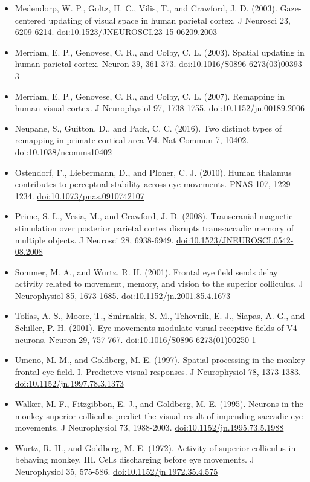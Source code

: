 \documentclass[11pt,a4paper]{article}
\begin{document}
\begin{itemize}[itemsep=2pt,topsep=2pt]
\item Medendorp, W. P., Goltz, H. C., Vilis, T., and Crawford, J. D. (2003). Gaze-centered updating of visual space in human parietal cortex. J Neurosci 23, 6209-6214. \href{https://doi.org/10.1523/JNEUROSCI.23-15-06209.2003}{doi:10.1523/JNEUROSCI.23-15-06209.2003}
\item Merriam, E. P., Genovese, C. R., and Colby, C. L. (2003). Spatial updating in human parietal cortex. Neuron 39, 361-373. \href{https://doi.org/10.1016/S0896-6273(03)00393-3}{doi:10.1016/S0896-6273(03)00393-3}
\item Merriam, E. P., Genovese, C. R., and Colby, C. L. (2007). Remapping in human visual cortex. J Neurophysiol 97, 1738-1755. \href{https://doi.org/10.1152/jn.00189.2006}{doi:10.1152/jn.00189.2006}
\item Neupane, S., Guitton, D., and Pack, C. C. (2016). Two distinct types of remapping in primate cortical area V4. Nat Commun 7, 10402. \href{https://doi.org/10.1038/ncomms10402}{doi:10.1038/ncomms10402}
\item Ostendorf, F., Liebermann, D., and Ploner, C. J. (2010). Human thalamus contributes to perceptual stability across eye movements. PNAS 107, 1229-1234. \href{https://doi.org/10.1073/pnas.0910742107}{doi:10.1073/pnas.0910742107}
\item Prime, S. L., Vesia, M., and Crawford, J. D. (2008). Transcranial magnetic stimulation over posterior parietal cortex disrupts transsaccadic memory of multiple objects. J Neurosci 28, 6938-6949. \href{https://doi.org/10.1523/JNEUROSCI.0542-08.2008}{doi:10.1523/JNEUROSCI.0542-08.2008}
\item Sommer, M. A., and Wurtz, R. H. (2001). Frontal eye field sends delay activity related to movement, memory, and vision to the superior colliculus. J Neurophysiol 85, 1673-1685. \href{https://doi.org/10.1152/jn.2001.85.4.1673}{doi:10.1152/jn.2001.85.4.1673}
\item Tolias, A. S., Moore, T., Smirnakis, S. M., Tehovnik, E. J., Siapas, A. G., and Schiller, P. H. (2001). Eye movements modulate visual receptive fields of V4 neurons. Neuron 29, 757-767. \href{https://doi.org/10.1016/S0896-6273(01)00250-1}{doi:10.1016/S0896-6273(01)00250-1}
\item Umeno, M. M., and Goldberg, M. E. (1997). Spatial processing in the monkey frontal eye field. I. Predictive visual responses. J Neurophysiol 78, 1373-1383. \href{https://doi.org/10.1152/jn.1997.78.3.1373}{doi:10.1152/jn.1997.78.3.1373}
\item Walker, M. F., Fitzgibbon, E. J., and Goldberg, M. E. (1995). Neurons in the monkey superior colliculus predict the visual result of impending saccadic eye movements. J Neurophysiol 73, 1988-2003. \href{https://doi.org/10.1152/jn.1995.73.5.1988}{doi:10.1152/jn.1995.73.5.1988}
\item Wurtz, R. H., and Goldberg, M. E. (1972). Activity of superior colliculus in behaving monkey. III. Cells discharging before eye movements. J Neurophysiol 35, 575-586. \href{https://doi.org/10.1152/jn.1972.35.4.575}{doi:10.1152/jn.1972.35.4.575}
\end{itemize}
\end{document}
